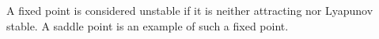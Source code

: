 \documentclass[12pt]{article}
\begin{document}
A fixed point is considered unstable if it is neither attracting nor Lyapunov stable.  A saddle point is an example of such a fixed point.
\end{document}
